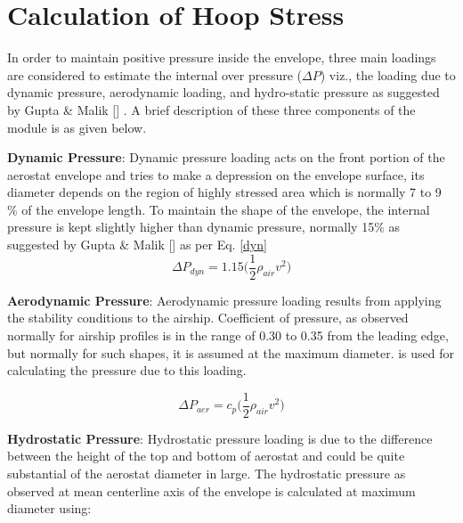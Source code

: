 \chapter{Calculation of Hoop Stress}
\label{Hoop stress}

In order to maintain positive pressure inside the envelope, three main loadings are considered to estimate the internal over pressure ($ \Delta P $) viz., the loading due to dynamic pressure, aerodynamic loading, and hydro-static pressure as suggested by Gupta \& Malik [] . A brief description of these three components of the module is as given below.

\textbf{Dynamic Pressure}: Dynamic pressure loading acts on the front portion of the aerostat envelope and tries to make a depression on the envelope surface, its diameter depends on the region of highly stressed area which is normally 7 to 9 \% of the envelope length. To maintain the shape of the envelope, the internal pressure is kept slightly higher than dynamic pressure, normally 15\% as suggested by Gupta \& Malik [] as per Eq. \ref{dyn}
\begin{equation}
\label{dyn}
\Delta P_{dyn} = 1.15 \bigg( \frac{1}{2} \rho_{air} v^{2} \bigg)
\end{equation}

\textbf{Aerodynamic Pressure}: Aerodynamic pressure loading results from applying the stability conditions to the airship. Coefficient of pressure, as observed normally for airship profiles is in the range of 0.30 to 0.35 from the leading edge, but normally for such shapes, it is assumed at the maximum diameter. is used for calculating the pressure due to this loading.

\begin{equation}
\label{aer}
\Delta P_{aer} = c_{p} \bigg( \frac{1}{2} \rho_{air} v^{2} \bigg)
\end{equation}

\textbf{Hydrostatic Pressure}: Hydrostatic pressure loading is due to the difference between the height of the top and bottom of aerostat and could be quite substantial of the aerostat diameter in large. The hydrostatic pressure as observed at mean centerline axis of the envelope is calculated at maximum diameter using:

